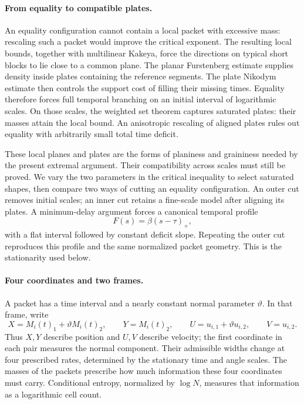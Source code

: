 \paragraph{From equality to compatible plates.}
An equality configuration cannot contain a local packet with excessive
mass: rescaling such a packet would improve the critical exponent.
The resulting local bounds, together with multilinear Kakeya, force
the directions on typical short blocks to lie close to a common plane.
The planar Furstenberg estimate supplies density inside plates containing
the reference segments. The plate Nikodym estimate then controls the
support cost of filling their missing times. Equality
therefore forces full temporal branching on an initial interval of
logarithmic scales. On those scales, the weighted set theorem captures
saturated plates: their masses attain the local bound. An anisotropic
rescaling of aligned plates rules out equality with arbitrarily small
total time deficit.

These local planes and plates are the forms of planiness and graininess
needed by the present extremal argument. Their compatibility across
scales must still be proved. We vary the two parameters in the critical
inequality to select saturated shapes, then compare two ways of cutting
an equality configuration. An outer cut removes initial scales; an
inner cut retains a fine-scale model after aligning its plates. A
minimum-delay argument forces a canonical temporal profile
\[
F(s)=\beta(s-\tau)_+,
\]
with a flat interval followed by constant deficit slope. Repeating the
outer cut reproduces this profile and the same normalized packet
geometry. This is the stationarity used below.

\paragraph{Four coordinates and two frames.}
A packet has a time interval and a nearly constant normal parameter
\(\vartheta\). In that frame, write
\[
X=M_i(t)_1+\vartheta M_i(t)_2,\qquad Y=M_i(t)_2,
\qquad U=u_{i,1}+\vartheta u_{i,2},\qquad V=u_{i,2}.
\]
Thus \(X,Y\) describe position and \(U,V\) describe velocity; the first
coordinate in each pair measures the normal component. Their admissible
widths change at four prescribed rates, determined by the stationary
time and angle scales. The masses of the packets prescribe how much
information these four coordinates must carry. Conditional entropy,
normalized by \(\log N\), measures that information as a logarithmic
cell count.

